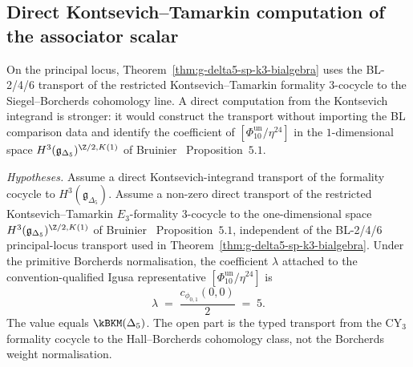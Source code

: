 \subsection{Direct Kontsevich--Tamarkin computation of the associator scalar}
\label{subsec:associator-scalar-direct}

On the principal locus, Theorem~\ref{thm:g-delta5-sp-k3-bialgebra}
uses the BL-2/4/6 transport of the restricted Kontsevich--Tamarkin
formality $3$-cocycle to the Siegel--Borcherds cohomology line. A
direct computation from the Kontsevich integrand is stronger: it would
construct the transport without importing the BL comparison data and identify
the coefficient of $[\Phi_{10}^{\mathrm{un}}/\eta^{24}]$ in the $1$-dimensional
space $H^3(\mathfrak{g}_{\Delta_5})^{\Z/2, K(1)}$ of
Bruinier~\cite{Bruinier2002} Proposition~$5.1$.

\begin{theorem}
\label{thm:associator-scalar-kontsevich}
\noindent\emph{Hypotheses.} Assume a direct Kontsevich-integrand transport of the formality cocycle to $H^3(\mathfrak g_{\Delta_5})$.
Assume a non-zero direct transport of the restricted Kontsevich--Tamarkin $E_3$-formality $3$-cocycle to the one-dimensional space $H^3(\mathfrak{g}_{\Delta_5})^{\Z/2, K(1)}$ of Bruinier~\cite{Bruinier2002} Proposition~$5.1$, independent of the BL-2/4/6 principal-locus transport used in Theorem~\ref{thm:g-delta5-sp-k3-bialgebra}. Under the primitive Borcherds normalisation, the coefficient $\lambda$ attached to the convention-qualified Igusa representative $[\Phi_{10}^{\mathrm{un}}/\eta^{24}]$ is
\[
 \lambda \;=\; \frac{c_{\phi_{0,1}}(0, 0)}{2}\;=\; 5.
\]
The value equals $\kBKM(\Delta_5)$. The open part is the typed
transport from the CY$_3$ formality cocycle to the Hall--Borcherds
cohomology class, not the Borcherds weight normalisation.
\end{theorem}

